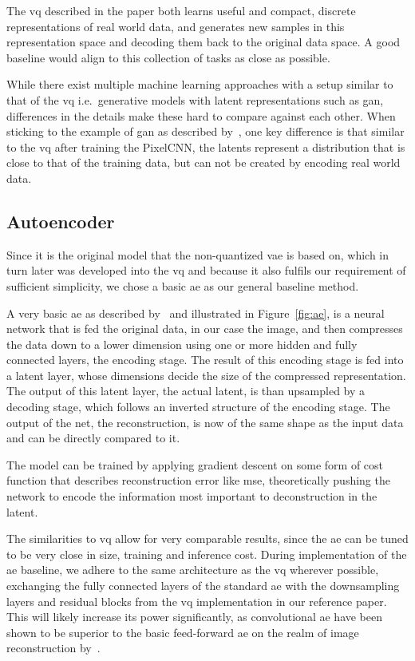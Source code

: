 The \ac{vq} described in the paper both learns useful and compact, discrete representations of real world data,
and generates new samples in this representation space and decoding them back to the original data space.
A good baseline would align to this collection of tasks as close as possible.

While there exist multiple machine learning approaches with a setup similar to that of the \ac{vq}
i.e.\ generative models with latent representations such as \ac{gan}, differences in the details make these hard to
compare against each other.
When sticking to the example of \ac{gan} as described by~\cite{gan}, one key difference is that similar to the
\ac{vq} after training the PixelCNN, the latents represent a distribution that is close to that of the training
data, but can not be created by encoding real world data.

\subsection{Autoencoder}\label{subsec:autoencoder}
Since it is the original model that the non-quantized \ac{vae} is based on, which in turn later was developed into the
\ac{vq} and because it also fulfils our requirement of sufficient simplicity, we chose a basic \ac{ae} as our general
baseline method.

A very basic \ac{ae} as described by~\cite{autoenc} and illustrated in Figure~\ref{fig:ae}, is a neural
network that is fed
the
original data, in our case the
image, and then compresses the data down to a lower dimension using one or more hidden and fully connected layers,
the encoding stage.
The result of this encoding stage is fed into a latent layer, whose dimensions decide the size of the compressed
representation.
The output of this latent layer, the actual latent, is than upsampled by a decoding stage, which follows an inverted
structure of the encoding stage.
The output of the net, the reconstruction, is now of the same shape as the input data and can be directly compared
to it.

The model can be trained by applying gradient descent on some form of cost function that describes reconstruction error
like \ac{mse}, theoretically pushing the network to encode the information most important to deconstruction in the
latent.

The similarities to \ac{vq} allow for very comparable results, since the \ac{ae} can be tuned to be very
close in size, training and inference cost.
During implementation of the \ac{ae} baseline, we adhere to the same architecture as the \ac{vq} wherever possible,
exchanging the fully connected layers of the standard \ac{ae} with the downsampling layers and
residual blocks from the \ac{vq} implementation in our reference paper.
This will likely increase its power significantly, as convolutional \ac{ae} have been shown to be superior to the
basic feed-forward \ac{ae} on the realm of image reconstruction by~\cite{convae}.


